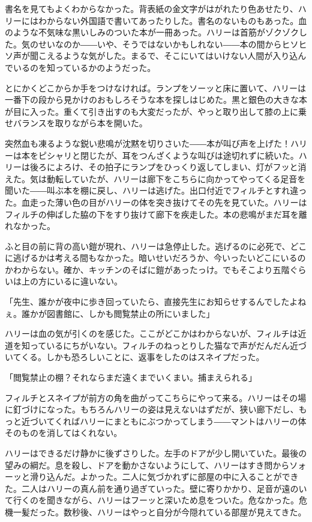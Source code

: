 \documentclass[10pt,a4paper]{article}
\begin{document}
\begin{CJK}{UTF8}{min}
書名を見てもよくわからなかった。背表紙の金文字がはがれたり色あせたり、ハリーにはわからない外国語で書いてあったりした。書名のないものもあった。血のような不気味な黒いしみのついた本が一冊あった。ハリーは首筋がゾクゾクした。気のせいなのか――いや、そうではないかもしれない――本の間からヒソヒソ声が聞こえるような気がした。まるで、そこにいてはいけない人間が入り込んでいるのを知っているかのようだった。

とにかくどこからか手をつけなければ。ランプをソーッと床に置いて、ハリーは一番下の段から見かけのおもしろそうな本を探しはじめた。黒と銀色の大きな本が目に入った。重くて引き出すのも大変だったが、やっと取り出して膝の上に乗せバランスを取りながら本を開いた。

突然血も凍るような鋭い悲鳴が沈黙を切りさいた――本が叫び声を上げた！ハリーは本をピシャリと閉じたが、耳をつんざくような叫びは途切れずに続いた。ハリーは後ろによろけ、その拍子にランプをひっくり返してしまい、灯がフッと消えた。気は動転していたが、ハリーは廊下をこちらに向かってやってくる足音を聞いた――叫ぶ本を棚に戻し、ハリーは逃げた。出口付近でフィルチとすれ違った。血走った薄い色の目がハリーの体を突き抜けてその先を見ていた。ハリーはフィルチの伸ばした脇の下をすり抜けて廊下を疾走した。本の悲鳴がまだ耳を離れなかった。

ふと目の前に背の高い鎧が現れ、ハリーは急停止した。逃げるのに必死で、どこに逃げるかは考える間もなかった。暗いせいだろうか、今いったいどこにいるのかわからない。確か、キッチンのそばに鎧があったっけ。でもそこより五階ぐらいは上の方にいるに違いない。

「先生、誰かが夜中に歩き回っていたら、直接先生にお知らせするんでしたよねぇ。誰かが図書館に、しかも閲覧禁止の所にいました」

ハリーは血の気が引くのを感じた。ここがどこかはわからないが、フィルチは近道を知っているにちがいない。フィルチのねっとりした猫なで声がだんだん近づいてくる。しかも恐ろしいことに、返事をしたのはスネイプだった。

「閲覧禁止の棚？それならまだ遠くまでいくまい。捕まえられる」

フィルチとスネイプが前方の角を曲がってこちらにやって来る。ハリーはその場に釘づけになった。もちろんハリーの姿は見えないはずだが、狭い廊下だし、もっと近づいてくればハリーにまともにぶつかってしまう――マントはハリーの体そのものを消してはくれない。

ハリーはできるだけ静かに後ずさりした。左手のドアが少し開いていた。最後の望みの綱だ。息を殺し、ドアを動かさないようにして、ハリーはすき問からソォーッと滑り込んだ。よかった。二人に気づかれずに部屋の中に入ることができた。二人はハリーの真ん前を通り過ぎていった。壁に寄りかかり、足音が遠のいて行くのを聞きながら、ハリーはフーッと深いため息をついた。危なかった。危機一髪だった。数秒後、ハリーはやっと自分が今隠れている部屋が見えてきた。


\end{CJK}
\end{document}
